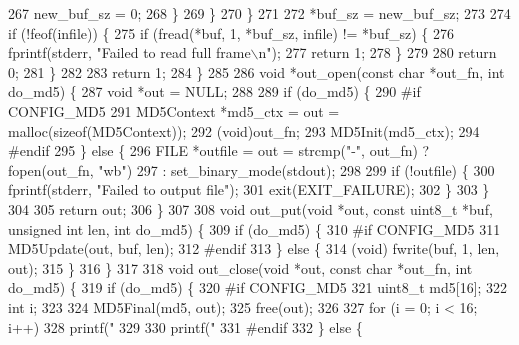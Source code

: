 \begin{DoxyCodeInclude}
{{{{{{{267         new\_buf\_sz = 0;
268       \}
269     \}
270   \}
271 
272   *buf\_sz = new\_buf\_sz;
273 
274   \textcolor{keywordflow}{if} (!feof(infile)) \{
275     \textcolor{keywordflow}{if} (fread(*buf, 1, *buf\_sz, infile) != *buf\_sz) \{
276       fprintf(stderr, \textcolor{stringliteral}{"Failed to read full frame\(\backslash\)n"});
277       \textcolor{keywordflow}{return} 1;
278     \}
279 
280     \textcolor{keywordflow}{return} 0;
281   \}
282 
283   \textcolor{keywordflow}{return} 1;
284 \}
285 
286 \textcolor{keywordtype}{void} *out\_open(\textcolor{keyword}{const} \textcolor{keywordtype}{char} *out\_fn, \textcolor{keywordtype}{int} do\_md5) \{
287   \textcolor{keywordtype}{void} *out = NULL;
288 
289   \textcolor{keywordflow}{if} (do\_md5) \{
290 \textcolor{preprocessor}{#if CONFIG\_MD5}
291     MD5Context *md5\_ctx = out = malloc(\textcolor{keyword}{sizeof}(MD5Context));
292     (void)out\_fn;
293     MD5Init(md5\_ctx);
294 \textcolor{preprocessor}{#endif}
295   \} \textcolor{keywordflow}{else} \{
296     FILE *outfile = out = strcmp(\textcolor{stringliteral}{"-"}, out\_fn) ? fopen(out\_fn, \textcolor{stringliteral}{"wb"})
297                           : set\_binary\_mode(stdout);
298 
299     \textcolor{keywordflow}{if} (!outfile) \{
300       fprintf(stderr, \textcolor{stringliteral}{"Failed to output file"});
301       exit(EXIT\_FAILURE);
302     \}
303   \}
304 
305   \textcolor{keywordflow}{return} out;
306 \}
307 
308 \textcolor{keywordtype}{void} out\_put(\textcolor{keywordtype}{void} *out, \textcolor{keyword}{const} uint8\_t *buf, \textcolor{keywordtype}{unsigned} \textcolor{keywordtype}{int} len, \textcolor{keywordtype}{int} do\_md5) \{
309   \textcolor{keywordflow}{if} (do\_md5) \{
310 \textcolor{preprocessor}{#if CONFIG\_MD5}
311     MD5Update(out, buf, len);
312 \textcolor{preprocessor}{#endif}
313   \} \textcolor{keywordflow}{else} \{
314     (void) fwrite(buf, 1, len, out);
315   \}
316 \}
317 
318 \textcolor{keywordtype}{void} out\_close(\textcolor{keywordtype}{void} *out, \textcolor{keyword}{const} \textcolor{keywordtype}{char} *out\_fn, \textcolor{keywordtype}{int} do\_md5) \{
319   \textcolor{keywordflow}{if} (do\_md5) \{
320 \textcolor{preprocessor}{#if CONFIG\_MD5}
321     uint8\_t md5[16];
322     \textcolor{keywordtype}{int} i;
323 
324     MD5Final(md5, out);
325     free(out);
326 
327     \textcolor{keywordflow}{for} (i = 0; i < 16; i++)
328       printf(\textcolor{stringliteral}{"%
329 
330     printf(\textcolor{stringliteral}{"  %
331 \textcolor{preprocessor}{#endif}
332   \} \textcolor{keywordflow}{else} \{
}}}}}}}}}
\end{DoxyCodeInclude}
